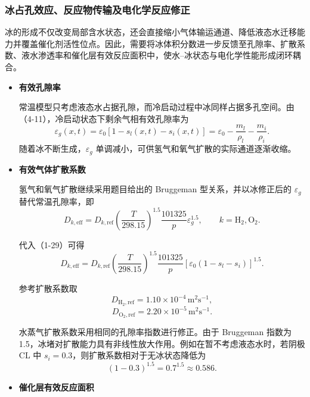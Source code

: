 \documentclass[bwprint]{gmcmthesis}
\numberwithin{figure}{section}
\begin{document}
\subsubsection{冰占孔效应、反应物传输及电化学反应修正}
冰的形成不仅改变局部含水状态，还会直接缩小气体输运通道、降低液态水迁移能力并覆盖催化剂活性位点。因此，需要将冰体积分数进一步反馈至孔隙率、扩散系数、液水渗透率和催化层有效反应面积中，使水–冰状态与电化学性能形成闭环耦合。

\begin{itemize}
\renewcommand{\labelitemi}{$\blacktriangleright$}
\item \textbf {有效孔隙率}

常温模型只考虑液态水占据孔隙，而冷启动过程中冰同样占据多孔空间。由（4-11），冷启动状态下剩余气相有效孔隙率为
\begin{equation}
\varepsilon_g(x,t) = \varepsilon_0 [1 - s_l(x,t) - s_i(x,t)] = \varepsilon_0 - \frac{m_l}{\rho_l} - \frac{m_i}{\rho_i}. \tag{4-44}
\end{equation}
随着冰不断生成，\(\varepsilon_g\) 单调减小，可供氢气和氧气扩散的实际通道逐渐收缩。


\item \textbf {有效气体扩散系数}

氢气和氧气扩散继续采用题目给出的 Bruggeman 型关系，并以冰修正后的 \(\varepsilon_g\) 替代常温孔隙率，即
\begin{equation}
D_{k,\text{eff}} = D_{k,\text{ref}} \left( \frac{T}{298.15} \right)^{1.5} \frac{101325}{p} \varepsilon_g^{1.5}, \qquad k = \text{H}_2, \text{O}_2. \tag{4-45}
\end{equation}

 代入（1-29）可得
\begin{equation}
D_{k,\text{eff}} = D_{k,\text{ref}} \left( \frac{T}{298.15} \right)^{1.5} \frac{101325}{p} [\varepsilon_0(1 - s_l - s_i)]^{1.5}. \tag{4-46}
\end{equation}

 参考扩散系数取
\[
D_{\text{H}_2,\text{ref}} = 1.10 \times 10^{-4} \, \text{m}^2\text{s}^{-1},
\]
\[
D_{\text{O}_2,\text{ref}} = 2.20 \times 10^{-5} \, \text{m}^2\text{s}^{-1}.
\]

 水蒸气扩散系数采用相同的孔隙率指数进行修正。由于 Bruggeman 指数为 1.5，冰堵对扩散能力具有非线性放大作用。例如在暂不考虑液态水时，若阴极 CL 中 \(s_i = 0.3\)，则扩散系数相对于无冰状态降低为
\[
(1 - 0.3)^{1.5} = 0.7^{1.5} \approx 0.586.
\]

\item \textbf {催化层有效反应面积}


\end{itemize}
\end{document}
